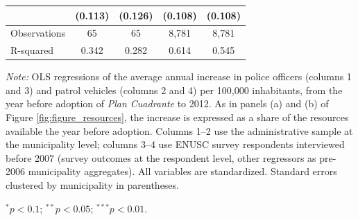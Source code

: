 \begin{table}[H]
\begin{threeparttable}
\begin{tabular}{@{}l cc cc@{}}
 & (0.113) & (0.126) & (0.108) & (0.108) \\
\midrule
Observations & 65 & 65 & 8,781 & 8,781 \\
R-squared & 0.342 & 0.282 & 0.614 & 0.545 \\
\bottomrule
\end{tabular}
\begin{tablenotes}[flushleft]
\footnotesize
\item \textit{Note:} OLS regressions of the average annual increase in police officers (columns 1 and 3) and patrol vehicles (columns 2 and 4) per 100{,}000 inhabitants, from the year before adoption of \emph{Plan Cuadrante} to 2012. As in panels (a) and (b) of Figure \ref{fig:figure_resources}, the increase is expressed as a share of the resources available the year before adoption. Columns 1--2 use the administrative sample at the municipality level; columns 3--4 use ENUSC survey respondents interviewed before 2007 (survey outcomes at the respondent level, other regressors as pre-2006 municipality aggregates). All variables are standardized. Standard errors clustered by municipality in parentheses.
\item $^{*}p<0.1$; $^{**}p<0.05$; $^{***}p<0.01$.
\end{tablenotes}
\end{threeparttable}
\end{table}
